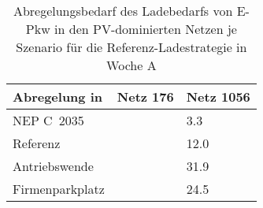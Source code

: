 {
\renewcommand{\arraystretch}{1.2}%
\begin{table}[H]
	\begin{center}
		\caption{Abregelungsbedarf des Ladebedarfs von E-Pkw in den PV-dominierten Netzen je Szenario für die Referenz-Ladestrategie in Woche A}
		\begin{tabu} to 0.6\textwidth {X[1.5] X[1, r] X[1, r]}
			\toprule
			Abregelung in \si{\mwh} 			 & Netz \num{176} & Netz \num{1056} \\ \midrule
			NEP C~\num{2035}                     &                & \num{3.3}       \\
			Referenz                             &                & \num{12.0}      \\
			Antriebswende                        &                & \num{31.9}      \\
			\glqq Firmenparkplatz\grqq{}         &                & \num{24.5}      \\ \bottomrule
		\end{tabu}
		\label{tab:pv_dominated_week_a_epkw_cur}
	\end{center}
	\vspace{-3mm}%
\end{table}
}